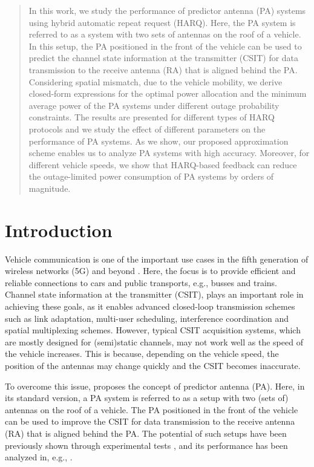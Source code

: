 \begin{abstract}
In this work, we study the performance of predictor antenna (PA) systems using hybrid automatic repeat request (HARQ). Here, the PA system is referred to as a system with two sets of antennas on the roof of a vehicle. In this setup, the PA positioned in the front of the vehicle can be used to predict the channel state information at the transmitter (CSIT) for data transmission to the receive antenna (RA) that is aligned behind the PA. Considering spatial mismatch, due to the vehicle mobility, we derive closed-form expressions for the optimal power allocation and the minimum average power of the PA systems under different outage probability constraints. The results are presented for different types of HARQ protocols and we study the effect of different parameters on the performance of PA systems. As we show, our proposed approximation scheme enables us to analyze PA systems with high accuracy. Moreover, for different vehicle speeds, we show that HARQ-based feedback can reduce the outage-limited power consumption of PA systems by orders of magnitude.
\end{abstract}

\section{Introduction}
Vehicle communication is one of the important use cases in the fifth generation of wireless networks (5G) and beyond \cite{Dang2020what}.  Here, the focus is to provide efficient and reliable connections to cars and public transports, e.g., busses and trains. Channel state information at the transmitter (CSIT), plays an important role in achieving these goals, as it enables advanced closed-loop transmission schemes such as link adaptation, multi-user scheduling, interference coordination and spatial multiplexing schemes.  However,  typical CSIT acquisition systems, which are mostly designed for (semi)static channels, may not work well as the speed of the vehicle increases. This is because, depending on the vehicle speed, the position of the antennas may change quickly and the CSIT becomes inaccurate. 

To overcome this issue, \cite{Sternad2012WCNCWusing} proposes the concept of predictor antenna (PA).  Here, in its standard version, a  PA system is referred to as a setup with two (sets of) antennas on the roof of a vehicle. The PA positioned in the front of the vehicle can be used to improve the CSIT for data transmission to the receive antenna (RA) that is aligned behind the PA. The potential of such setups have been previously shown through experimental tests \cite{Sternad2012WCNCWusing,Dinh2013ICCVEadaptive,Jamaly2014EuCAPanalysis}, and its performance has been analyzed in, e.g., \cite{Guo2019WCLrate,guo2020semilinear,guo2020rate}. 

